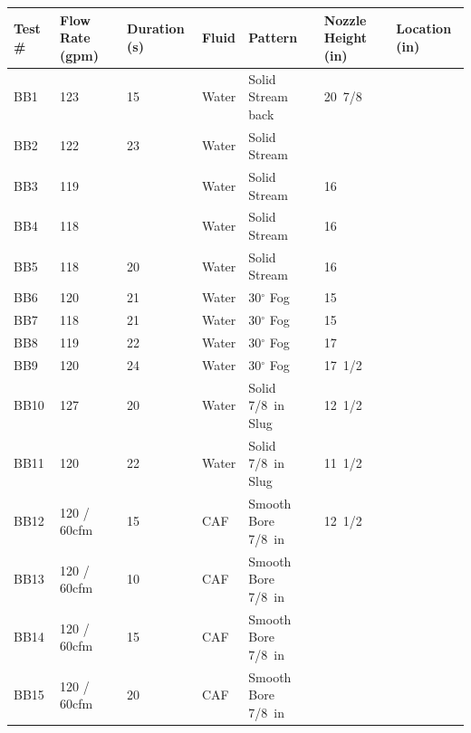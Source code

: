 \documentclass[12pt,oneside]{book}
\begin{document}
\begin{table}[!ht]
\footnotesize
\centering
{}\label{tab:spray_density_tests}
\begin{tabular}{lllllll}
\toprule[1.5pt]
Test \#    &   Flow Rate (gpm)  & Duration (s)  & Fluid  &  Pattern            & Nozzle Height (in) & Location (in) \\
\midrule
BB1        &   123              & 15            & Water  &  Solid Stream back  & 20~7/8             &          \\
BB2        &   122              & 23            & Water  &  Solid Stream       &                    &          \\
BB3        &   119              &               & Water  &  Solid Stream       & 16                 &          \\
BB4        &   118              &               & Water  &  Solid Stream       & 16                 &          \\
BB5        &   118              & 20            & Water  &  Solid Stream       & 16                 &          \\
BB6        &   120              & 21            & Water  &  30$^{\circ}$ Fog   & 15                 &          \\
BB7        &   118              & 21            & Water  &  30$^{\circ}$ Fog   & 15                 &          \\
BB8        &   119              & 22            & Water  &  30$^{\circ}$ Fog   & 17                 &          \\
BB9        &   120              & 24            & Water  &  30$^{\circ}$ Fog   & 17~1/2             &          \\
BB10       &   127              & 20            & Water  &  Solid 7/8~in Slug  & 12~1/2             &          \\
BB11       &   120              & 22            & Water  &  Solid 7/8~in Slug  & 11~1/2             &          \\
BB12       &   120 / 60cfm      & 15            & CAF    &  Smooth Bore 7/8~in & 12~1/2             &          \\
BB13       &   120 / 60cfm      & 10            & CAF    &  Smooth Bore 7/8~in &                    &          \\
BB14       &   120 / 60cfm      & 15            & CAF    &  Smooth Bore 7/8~in &                    &          \\
BB15       &   120 / 60cfm      & 20            & CAF    &  Smooth Bore 7/8~in &                    &          \\

\end{tabular}
\end{table}
\end{document}
